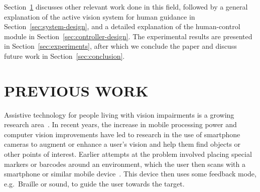 \documentclass[a4paper, twoside]{article}
\begin{document}
Section~\ref{sec:previous-work} discusses other relevant work done in this field, followed by a general explanation of the active vision system for human guidance in Section~\ref{sec:system-design}, and a detailed explanation of the human-control module in Section~\ref{sec:controller-design}. The experimental results are presented in Section~\ref{sec:experiments}, after which we conclude the paper and discuss future work in Section~\ref{sec:conclusion}. 

\section{\uppercase{Previous Work}}\label{sec:previous-work}

\noindent Assistive technology for people living with vision impairments is a growing research area~\cite{Manduchi2012,khoo2016multimodal}. In recent years, the increase in mobile processing power and computer vision improvements have led to research in the use of smartphone cameras to augment or enhance a user's vision and help them find objects or other points of interest. Earlier attempts at the problem involved placing special markers or barcodes around an environment, which the user then scans with a smartphone or similar mobile device~\cite{gude2013blind,iannizzotto2005badge3d,manduchi2012mobile}. This device then uses some feedback mode, e.g.\ Braille or sound, to guide the user towards the target. %
\end{document}
